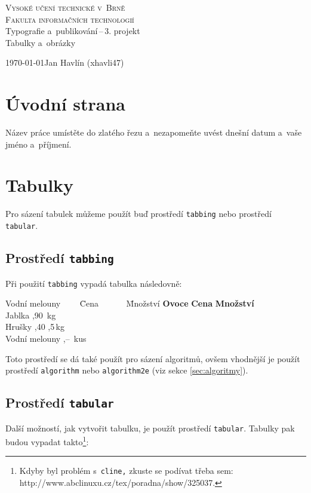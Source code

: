 \documentclass[11pt,a4paper]{article}
\begin{document}
\begin{titlepage}
\begin{center}
	\Huge
	\textsc{Vysoké učení technické v~Brně}\\
	\huge
	\textsc{Fakulta informačních technologií} \\
	\LARGE
	Typografie a~publikování\,--\,3. projekt \\
	\Huge
	Tabulky a~obrázky
\end{center}
{\Large \today \hfill Jan Havlín (xhavli47)}
\end{titlepage}

\section{Úvodní strana}
Název práce umístěte do zlatého řezu a~nezapomeňte uvést dnešní datum a~vaše jméno a~příjmení.

\section{Tabulky}
Pro sázení tabulek můžeme použít buď prostředí \texttt{tabbing} nebo prostředí \texttt{tabular}.

\subsection{Prostředí \texttt{tabbing}}
Při použití \texttt{tabbing} vypadá tabulka následovně:
\begin{tabbing}
Vodní melouny~~~~ \= Cena~~~~~~ \= Množství \kill
\textbf{Ovoce} \> \textbf{Cena} \> \textbf{Množství} \\
Jablka ,90 \,kg \\
Hrušky ,40 ,5\,kg \\
Vodní melouny ,-- \,kus \\
\end{tabbing}

\noindent Toto prostředí se dá také použít pro sázení algoritmů, ovšem vhodnější je použít prostředí \texttt{algorithm} nebo \texttt{algorithm2e} (viz sekce \ref{sec:algoritmy}).

\subsection{Prostředí \texttt{tabular}}
Další možností, jak vytvořit tabulku, je použít prostředí \texttt{tabular}. Tabulky pak budou vypadat takto\footnote{Kdyby byl problém s~\texttt{cline,} zkuste se podívat třeba sem: http://www.abclinuxu.cz/tex/poradna/show/325037.}:
\end{document}
